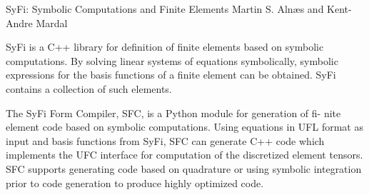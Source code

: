               {SyFi: Symbolic Computations and Finite Elements}
              {Martin S. Aln\ae{}s and Kent-Andre Mardal}

\editornote{[alnes-3]}

SyFi is a C++ library for definition of finite elements based on
symbolic computations. By solving linear systems of equations
symbolically, symbolic expressions for the basis functions of a finite
element can be obtained. SyFi contains a collection of such elements.

The SyFi Form Compiler, SFC, is a Python module for generation of fi-
nite element code based on symbolic computations. Using equations in
UFL format as input and basis functions from SyFi, SFC can generate
C++ code which implements the UFC interface for computation of the
discretized element tensors. SFC supports generating code based on
quadrature or using symbolic integration prior to code generation to
produce highly optimized code.
